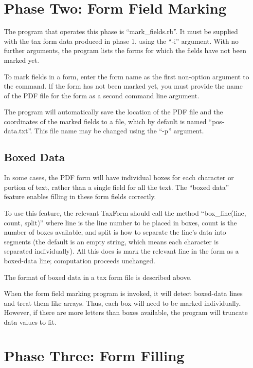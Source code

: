 \documentclass[12pt]{article}
\begin{document}
\section{Phase Two: Form Field Marking}

The program that operates this phase is ``mark\_fields.rb''. It must be supplied
with the tax form data produced in phase 1, using the ``-i'' argument. With no
further arguments, the program lists the forms for which the fields have not
been marked yet.

To mark fields in a form, enter the form name as the first non-option argument
to the command. If the form has not been marked yet, you must provide the name
of the PDF file for the form as a second command line argument.

The program will automatically save the location of the PDF file and the
coordinates of the marked fields to a file, which by default is named
``pos-data.txt''. This file name may be changed using the ``-p'' argument.




\subsection{Boxed Data}

In some cases, the PDF form will have individual boxes for each character or
portion of text, rather than a single field for all the text. The ``boxed data''
feature enables filling in these form fields correctly.

To use this feature, the relevant TaxForm should call the method
``box\_line(line, count, split)'' where line is the line number to be placed
in boxes, count is the number of boxes available, and split is how to separate
the line's data into segments (the default is an empty string, which means each
character is separated individually). All this does is mark the relevant line in
the form as a boxed-data line; computation proceeds unchanged.

The format of boxed data in a tax form file is described above.

When the form field marking program is invoked, it will detect boxed-data lines
and treat them like arrays. Thus, each box will need to be marked individually.
However, if there are more letters than boxes available, the program will
truncate data values to fit.






\section{Phase Three: Form Filling}
\end{document}
